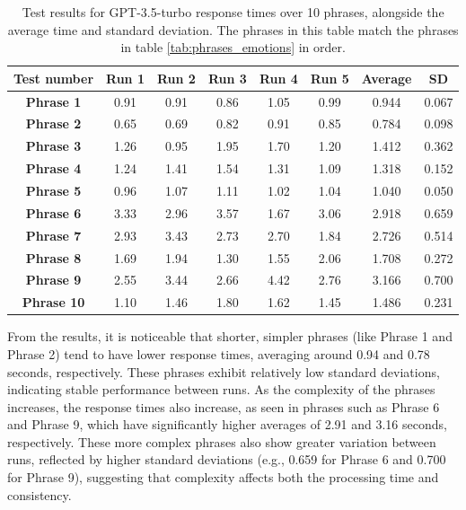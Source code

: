 \begin{table}[h!]
\centering{}
\caption{Test results for GPT-3.5-turbo response times over 10 phrases, alongside the average time and standard deviation. The phrases in this table match the phrases in table \ref{tab:phrases_emotions} in order.}
\begin{tabular}{|c|c|c|c|c|c|c|c|}
\hline
\textbf{Test number} & \textbf{Run 1} & \textbf{Run 2} & \textbf{Run 3} & \textbf{Run 4} & \textbf{Run 5} & \textbf{Average} & \textbf{SD} \\ \hline
\textbf{Phrase 1} & 0.91 & 0.91 & 0.86 & 1.05 & 0.99 & 0.944 & 0.067          \\ \hline
\textbf{Phrase 2} & 0.65 & 0.69 & 0.82 & 0.91 & 0.85 & 0.784 & 0.098          \\ \hline
\textbf{Phrase 3} & 1.26 & 0.95 & 1.95 & 1.70 & 1.20 & 1.412 & 0.362          \\ \hline
\textbf{Phrase 4} & 1.24 & 1.41 & 1.54 & 1.31 & 1.09 & 1.318 & 0.152          \\ \hline
\textbf{Phrase 5} & 0.96 & 1.07 & 1.11 & 1.02 & 1.04 & 1.040 & 0.050          \\ \hline
\textbf{Phrase 6} & 3.33 & 2.96 & 3.57 & 1.67 & 3.06 & 2.918 & 0.659          \\ \hline
\textbf{Phrase 7} & 2.93 & 3.43 & 2.73 & 2.70 & 1.84 & 2.726 & 0.514          \\ \hline
\textbf{Phrase 8} & 1.69 & 1.94 & 1.30 & 1.55 & 2.06 & 1.708 & 0.272          \\ \hline
\textbf{Phrase 9} & 2.55 & 3.44 & 2.66 & 4.42 & 2.76 & 3.166 & 0.700          \\ \hline
\textbf{Phrase 10}& 1.10 & 1.46 & 1.80 & 1.62 & 1.45 & 1.486 & 0.231          \\ \hline
\end{tabular}
\label{tab:phrase_gpt3.5}
\end{table}

From the results, it is noticeable that shorter, simpler phrases (like Phrase 1 and Phrase 2) tend to have lower response times, averaging around 0.94 and 0.78 seconds, respectively. These phrases exhibit relatively low standard deviations, indicating stable performance between runs. As the complexity of the phrases increases, the response times also increase, as seen in phrases such as Phrase 6 and Phrase 9, which have significantly higher averages of 2.91 and 3.16 seconds, respectively. These more complex phrases also show greater variation between runs, reflected by higher standard deviations (e.g., 0.659 for Phrase 6 and 0.700 for Phrase 9), suggesting that complexity affects both the processing time and consistency.

